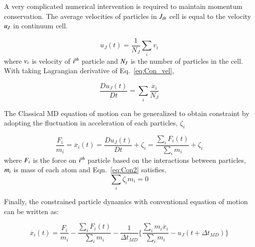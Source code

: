 \documentclass[preprint,12pt]{elsarticle}
\begin{document}
A very complicated numerical intervention is required to maintain momentum conservation. The average velocities of particles in $\it J_{th}$ cell is equal to the velocity $\it u_{J}$ in continuum cell.

\vspace{-.2em}
\begin{equation}
 u_{J}(t) = \frac{1}{N_{J}} \displaystyle\sum_{i} v_{i}
 \label{eq:Con_vel}
\end{equation}
\normalsize
where $\it v_{i}$ is velocity of $\it i^{th}$ particle and $\it N_{J}$ is the number of particles in the cell. With taking Lagrangian derivative of Eq.~\ref{eq:Con_vel},

\vspace{-.2em}
\begin{equation}
 \frac{Du_{J}(t)}{Dt} =  \displaystyle\sum_{i} \frac{\ddot{x_{i}}}{N_{J}}
 \label{eq:Lagrangian}
\end{equation}
\normalsize

The Classical MD equation of motion can be generalized to obtain constraint by adopting the fluctuation in acceleration of each particles, $\zeta_{i}$

\vspace{-.2em}
\begin{equation}
 \frac{F_{i}}{m_{i}} = \ddot{x_{i}}(t)  =   \frac{Du_{J}(t)}{Dt} + \zeta_{i} = \frac{\displaystyle\sum_{i}F_{i}(t)} {\displaystyle\sum_{i}m_{i}} +   \zeta_{i}
 \label{eq:Con2}
\end{equation}
\normalsize
where $\it F_{i}$ is the force on $\it i^{th}$ particle based on the interactions between particles,  $\it m_{i}$ is mass of each atom and  Eqn.~\ref{eq:Con2} satisfies,
\vspace{-.2em}
\begin{equation}
\displaystyle\sum_{i}\zeta_{i}m_{i} = 0
 \label{eq:Con2}
\end{equation}
\normalsize

Finally, the constrained particle dynamics with conventional equation of motion can be written as:

\vspace{-.2em}
\begin{equation}
 \ddot{x_{i}}(t) = \frac{F_{i}}{m_{i}} -  \frac{\displaystyle\sum_{i}F_{i}(t)} {\displaystyle\sum_{i}m_{i}} - \frac{1}{\Delta t_{MD}} \{  \frac{\displaystyle\sum_{i}m_{i}\dot{x_{i}}} {\displaystyle\sum_{i}m_{i}} - u_{J}(t + \Delta t_{MD})\}
 \label{eq:Con3}
\end{equation}
\normalsize
\end{document}
